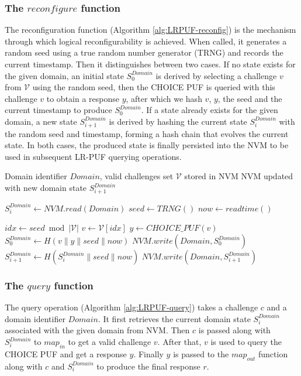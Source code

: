 \subsubsection{The $reconfigure$ function}
The reconfiguration function (Algorithm \ref{alg:LRPUF-reconfig}) is the mechanism through which logical reconfigurability is achieved. When called, it generates a random seed using a true random number generator (TRNG) and records the current timestamp. Then it distinguishes between two cases. If no state exists for the given domain, an initial state $S_0^{Domain}$ is derived by selecting a challenge $v$ from  $\mathcal{V}$ using the random seed, then the CHOICE PUF is queried with this challenge $v$ to obtain a response $y$, after which we hash $v$, $y$, the seed and the current timestamp to produce $S_0^{Domain}$. If a state already exists for the given domain, a new state $S_{i+1}^{Domain}$ is derived by hashing the current state $S_i^{Domain}$ with the random seed and timestamp, forming a hash chain that evolves the current state. In both cases, the produced state is finally persisted into the NVM to be used in subsequent LR-PUF querying operations.

\begin{algorithm}[ht!]
\caption{$reconfigure(Domain)$}
\begin{algorithmic}[1]
    \Require Domain identifier $Domain$, valid challenges set $\mathcal{V}$ stored in NVM
    \Ensure  NVM updated with new domain state $S_{i+1}^{Domain}$

    \State $S_i^{Domain} \leftarrow NVM.read(Domain)$
    \State $seed \leftarrow TRNG()$
    \State $now \leftarrow readtime()$

     
        \State $idx \leftarrow seed \bmod |\mathcal{V}|$
        \State $v \leftarrow \mathcal{V}[idx]$
        \State $y \leftarrow CHOICE\_PUF(v)$
        \State $S_0^{Domain} \leftarrow H(v \mathbin\| y \mathbin\| seed \mathbin\| now)$
        \State $NVM.write(Domain,S_0^{Domain})$
    \Else
        \State $S_{i+1}^{Domain} \leftarrow H(S_{i}^{Domain} \mathbin\| seed \mathbin\| now)$ 
        \State $NVM.write(Domain,S_{i+1}^{Domain})$
    \EndIf
\end{algorithmic}
\label{alg:LRPUF-reconfig}
\end{algorithm}

\subsubsection{The $query$ function}
The query operation (Algorithm \ref{alg:LRPUF-query}) takes a challenge $c$ and a domain identifier $Domain$. It first retrieves the current domain state $S_i^{Domain}$ associated with the given domain from NVM. Then $c$ is passed along with $S_i^{Domain}$ to $map_{in}$ to get a valid challenge $v$. After that, $v$ is used to query the CHOICE PUF and get a response $y$. Finally $y$ is passed to the $map_{out}$ function along with $c$ and $S_i^{Domain}$ to produce the final response $r$.

